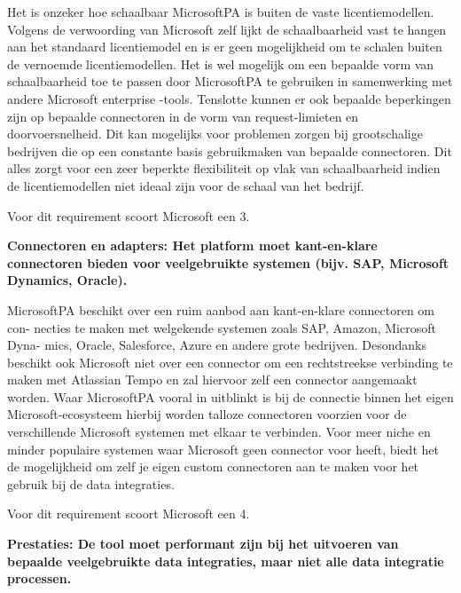 Het is onzeker hoe schaalbaar MicrosoftPA is buiten de vaste licentiemodellen. Volgens de verwoording van Microsoft zelf lijkt de schaalbaarheid vast te hangen aan het standaard licentiemodel en is er geen mogelijkheid om te schalen buiten de vernoemde licentiemodellen. Het is wel mogelijk om een bepaalde vorm van schaalbaarheid toe te passen door MicrosoftPA te gebruiken in samenwerking met andere Microsoft enterprise -tools. Tenslotte kunnen er ook bepaalde beperkingen zijn op bepaalde connectoren in de vorm van request-limieten en doorvoersnelheid. Dit kan mogelijks voor problemen zorgen bij grootschalige bedrijven die op een constante basis gebruikmaken van bepaalde connectoren. Dit alles zorgt voor een zeer beperkte flexibiliteit op vlak van schaalbaarheid indien de licentiemodellen niet ideaal zijn voor de schaal van het bedrijf.


Voor dit requirement scoort Microsoft een 3.

\vspace{\baselineskip}

\textbf{Connectoren en adapters: Het platform moet kant-en-klare connectoren bieden voor veelgebruikte systemen (bijv. SAP, Microsoft Dynamics, Oracle).}
\vspace{\baselineskip}

MicrosoftPA beschikt over een ruim aanbod aan kant-en-klare connectoren om con-
necties te maken met welgekende systemen zoals SAP, Amazon, Microsoft Dyna-
mics, Oracle, Salesforce, Azure en andere grote bedrijven. Desondanks beschikt ook Microsoft niet over een connector om een rechtstreekse verbinding te maken met Atlassian Tempo en zal hiervoor zelf een connector aangemaakt worden. Waar MicrosoftPA vooral in uitblinkt is bij de connectie binnen het eigen Microsoft-ecosysteem hierbij worden talloze connectoren voorzien voor de verschillende Microsoft systemen met elkaar te verbinden. Voor meer niche en minder populaire systemen waar Microsoft geen connector voor heeft, biedt het de mogelijkheid om zelf je eigen custom connectoren aan te maken voor het gebruik bij de data integraties.


Voor dit requirement scoort Microsoft een 4.

\vspace{\baselineskip}

\textbf{Prestaties: De tool moet performant zijn bij het uitvoeren van bepaalde veelgebruikte data integraties, maar niet alle data integratie processen.}

\vspace{\baselineskip}

